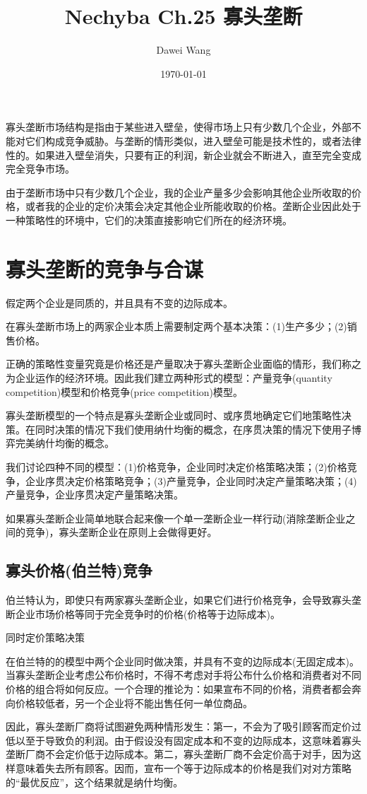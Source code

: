\documentclass{article}
\title{Nechyba Ch.25 寡头垄断}
\author{Dawei Wang}
\date{\today}
\begin{document}
	\maketitle
寡头垄断市场结构是指由于某些进入壁垒，使得市场上只有少数几个企业，外部不能对它们构成竞争威胁。与垄断的情形类似，进入壁垒可能是技术性的，或者法律性的。如果进入壁垒消失，只要有正的利润，新企业就会不断进入，直至完全变成完全竞争市场。

由于垄断市场中只有少数几个企业，我的企业产量多少会影响其他企业所收取的价格，或者我的企业的定价决策会决定其他企业所能收取的价格。垄断企业因此处于一种策略性的环境中，它们的决策直接影响它们所在的经济环境。

\section{寡头垄断的竞争与合谋}

假定两个企业是同质的，并且具有不变的边际成本。

在寡头垄断市场上的两家企业本质上需要制定两个基本决策：(1)生产多少；(2)销售价格。

正确的策略性变量究竟是价格还是产量取决于寡头垄断企业面临的情形，我们称之为企业运作的经济环境。因此我们建立两种形式的模型：产量竞争(quantity competition)模型和价格竞争(price competition)模型。

寡头垄断模型的一个特点是寡头垄断企业或同时、或序贯地确定它们地策略性决策。在同时决策的情况下我们使用纳什均衡的概念，在序贯决策的情况下使用子博弈完美纳什均衡的概念。

我们讨论四种不同的模型：(1)价格竞争，企业同时决定价格策略决策；(2)价格竞争，企业序贯决定价格策略竞争；(3)产量竞争，企业同时决定产量策略决策；(4)产量竞争，企业序贯决定产量策略决策。

如果寡头垄断企业简单地联合起来像一个单一垄断企业一样行动(消除垄断企业之间的竞争)，寡头垄断企业在原则上会做得更好。

\subsection{寡头价格(伯兰特)竞争}

伯兰特认为，即使只有两家寡头垄断企业，如果它们进行价格竞争，会导致寡头垄断企业市场价格等同于完全竞争时的价格(价格等于边际成本)。

\hspace*{\fill}

同时定价策略决策
	
在伯兰特的的模型中两个企业同时做决策，并具有不变的边际成本(无固定成本)。当寡头垄断企业考虑公布价格时，不得不考虑对手将公布什么价格和消费者对不同价格的组合将如何反应。一个合理的推论为：如果宣布不同的价格，消费者都会奔向价格较低者，另一个企业将不能出售任何一单位商品。

因此，寡头垄断厂商将试图避免两种情形发生：第一，不会为了吸引顾客而定价过低以至于导致负的利润。由于假设没有固定成本和不变的边际成本，这意味着寡头垄断厂商不会定价低于边际成本。第二，寡头垄断厂商不会定价高于对手，因为这样意味着失去所有顾客。因而，宣布一个等于边际成本的价格是我们对对方策略的“最优反应”，这个结果就是纳什均衡。

 
\end{document}
